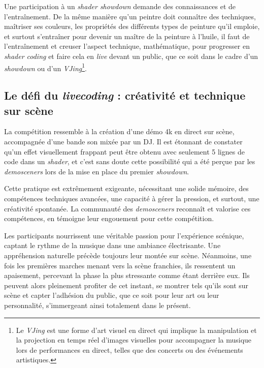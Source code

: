 Une participation à un \textit{shader showdown} demande des connaissances et de l’entraînement. De la même manière qu’un peintre doit connaître des techniques, maîtriser ses couleurs, les propriétés des différents types de peinture qu’il emploie, et surtout s’entraîner pour devenir un maître de la peinture à l’huile, il faut de l’entraînement et creuser l’aspect technique, mathématique, pour progresser en \textit{shader coding} et faire cela en \textit{live} devant un public, que ce soit dans le cadre d’un \textit{showdown} ou d’un \textit{VJing}\footnote{Le \textit{VJing} est une forme d'art visuel en direct qui implique la manipulation et la projection en temps réel d'images visuelles pour accompagner la musique lors de performances en direct, telles que des concerts ou des événements artistiques.}.



\subsection*{Le défi du \textit{livecoding} : créativité et technique sur scène}

La compétition ressemble à la création d'une démo 4k en direct sur scène, accompagnée d'une bande son mixée par un DJ. Il est étonnant de constater qu'un effet visuellement frappant peut être obtenu avec seulement 5 lignes de code dans un \textit{shader}, et c'est sans doute cette possibilité qui a été perçue par les \textit{demosceners} lors de la mise en place du premier \textit{showdown}.

Cette pratique est extrêmement exigeante, nécessitant une solide mémoire, des compétences techniques avancées, une capacité à gérer la pression, et surtout, une créativité spontanée. La communauté des \textit{demosceners} reconnaît et valorise ces compétences, en témoigne leur engouement pour cette compétition.



Les participants nourrissent une véritable passion pour l'expérience scénique, captant le rythme de la musique dans une ambiance électrisante. Une appréhension naturelle précède toujours leur montée sur scène. Néanmoins, une fois les premières marches menant vers la scène franchies, ils ressentent un apaisement, percevant la phase la plus stressante comme étant derrière eux. Ils peuvent alors pleinement profiter de cet instant, se montrer tels qu'ils sont sur scène et capter l'adhésion du public, que ce soit pour leur art ou leur personnalité, s'immergeant ainsi totalement dans le présent.

